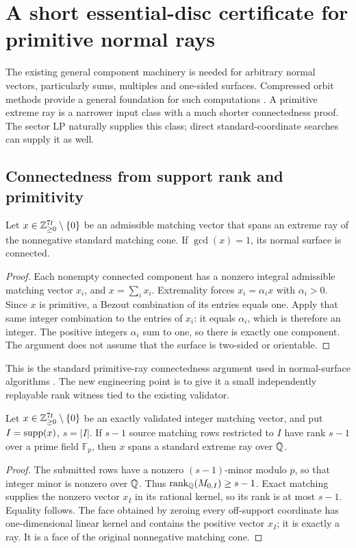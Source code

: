 \section{A short essential-disc certificate for primitive normal rays}\label{sec:ray}

The existing general component machinery is needed for arbitrary normal vectors, particularly sums, multiples and one-sided surfaces. Compressed orbit methods provide a general foundation for such computations \cite{AHT}. A primitive extreme ray is a narrower input class with a much shorter connectedness proof. The sector LP naturally supplies this class; direct standard-coordinate searches can supply it as well.

\subsection{Connectedness from support rank and primitivity}

\begin{lemma}\label{lem:primitive-connected}
Let $x\in\mathbb Z_{\ge0}^{7t}\setminus\{0\}$ be an admissible matching vector that spans an extreme ray of the nonnegative standard matching cone. If $\gcd(x)=1$, its normal surface is connected.
\end{lemma}
\begin{proof}
Each nonempty connected component has a nonzero integral admissible matching vector $x_i$, and $x=\sum_i x_i$. Extremality forces $x_i=\alpha_i x$ with $\alpha_i>0$. Since $x$ is primitive, a Bezout combination of its entries equals one. Apply that same integer combination to the entries of $x_i$: it equals $\alpha_i$, which is therefore an integer. The positive integers $\alpha_i$ sum to one, so there is exactly one component. The argument does not assume that the surface is two-sided or orientable.
\end{proof}

This is the standard primitive-ray connectedness argument used in normal-surface algorithms \cite{HLP,BO}. The new engineering point is to give it a small independently replayable rank witness tied to the existing validator.

\begin{theorem}\label{thm:ray-rank}
Let $x\in\mathbb Z_{\ge0}^{7t}\setminus\{0\}$ be an exactly validated integer matching vector, and put $I=\operatorname{supp}(x)$, $s=|I|$. If $s-1$ source matching rows restricted to $I$ have rank $s-1$ over a prime field $\mathbb F_p$, then $x$ spans a standard extreme ray over $\mathbb Q$.
\end{theorem}
\begin{proof}
The submitted rows have a nonzero $(s-1)$-minor modulo $p$, so that integer minor is nonzero over $\mathbb Q$. Thus $\operatorname{rank}_\mathbb Q(M_{0,I})\ge s-1$. Exact matching supplies the nonzero vector $x_I$ in its rational kernel, so its rank is at most $s-1$. Equality follows. The face obtained by zeroing every off-support coordinate has one-dimensional linear kernel and contains the positive vector $x_I$; it is exactly a ray. It is a face of the original nonnegative matching cone.
\end{proof}

